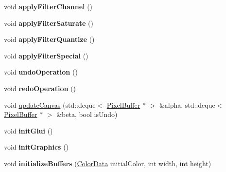 \begin{DoxyCompactItemize}
\item 
void {\bfseries apply\+Filter\+Channel} ()\hypertarget{classFlashPhotoApp_a8c8d8c714d059083f49e1e0cd1336321}{}\label{classFlashPhotoApp_a8c8d8c714d059083f49e1e0cd1336321}

\item 
void {\bfseries apply\+Filter\+Saturate} ()\hypertarget{classFlashPhotoApp_aabd2e2b487ebe038cbcbfa700d5951f9}{}\label{classFlashPhotoApp_aabd2e2b487ebe038cbcbfa700d5951f9}

\item 
void {\bfseries apply\+Filter\+Quantize} ()\hypertarget{classFlashPhotoApp_a5a9c62db1aa83250b4f95c94f5dac762}{}\label{classFlashPhotoApp_a5a9c62db1aa83250b4f95c94f5dac762}

\item 
void {\bfseries apply\+Filter\+Special} ()\hypertarget{classFlashPhotoApp_a7b1664e842e4a0a16cf7c340e126de17}{}\label{classFlashPhotoApp_a7b1664e842e4a0a16cf7c340e126de17}

\item 
void {\bfseries undo\+Operation} ()\hypertarget{classFlashPhotoApp_ad33153aceb1cca61bb682c00ae8e22ff}{}\label{classFlashPhotoApp_ad33153aceb1cca61bb682c00ae8e22ff}

\item 
void {\bfseries redo\+Operation} ()\hypertarget{classFlashPhotoApp_aad1a00932e723e17c39f6959c42d9f5f}{}\label{classFlashPhotoApp_aad1a00932e723e17c39f6959c42d9f5f}

\item 
void \hyperlink{classFlashPhotoApp_af90d307fdc027a037816a63757a17120}{update\+Canvas} (std\+::deque$<$ \hyperlink{classPixelBuffer}{Pixel\+Buffer} $\ast$ $>$ \&alpha, std\+::deque$<$ \hyperlink{classPixelBuffer}{Pixel\+Buffer} $\ast$ $>$ \&beta, bool is\+Undo)
\item 
void {\bfseries init\+Glui} ()\hypertarget{classFlashPhotoApp_a8360b752328c423d850d819361e18a12}{}\label{classFlashPhotoApp_a8360b752328c423d850d819361e18a12}

\item 
void {\bfseries init\+Graphics} ()\hypertarget{classFlashPhotoApp_a9a786ee86c70c142fd957421f9354996}{}\label{classFlashPhotoApp_a9a786ee86c70c142fd957421f9354996}

\item 
void {\bfseries initialize\+Buffers} (\hyperlink{classColorData}{Color\+Data} initial\+Color, int width, int height)\hypertarget{classFlashPhotoApp_afed06134c0c49494fb5055a93dc8423f}{}\label{classFlashPhotoApp_afed06134c0c49494fb5055a93dc8423f}


\end{DoxyCompactItemize}
